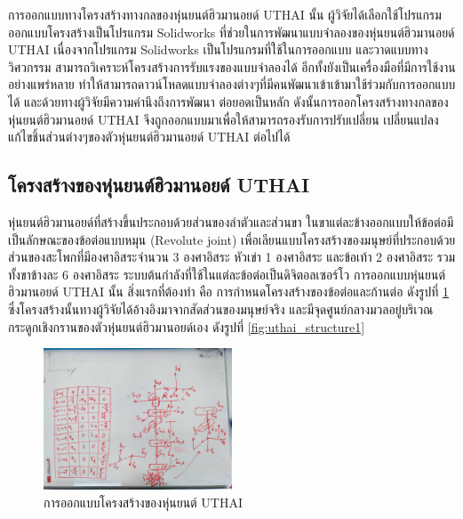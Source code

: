 การออกแบบทางโครงสร้างทางกลของหุ่นยนต์ฮิวมานอยด์ UTHAI นั้น ผู้วิจัยได้เลือกใช้โปรแกรมออกแบบโครงสร้างเป็นโปรแกรม Solidworks
ที่ช่วยในการพัฒนาแบบจำลองของหุ่นยนต์ฮิวมานอยด์ UTHAI
เนื่องจากโปรแกรม Solidworks เป็นโปรแกรมที่ใช้ในการออกแบบ และวาดแบบทางวิศวกรรม
สามารถวิเคราะห์โครงสร้างการรับแรงของแบบจำลองได้ อีกทั้งยังเป็นเครื่องมือที่มีการใช้งานอย่างแพร่หลาย
ทำให้สามารถดาวน์โหลดแบบจำลองต่างๆที่มีคนพัฒนาเข้าเข้ามาใช้ร่วมกับการออกแบบได้ 
และด้วยทางผู้วิจัยมีความคำนึงถึงการพัฒนา ต่อยอดเป็นหลัก ดังนั้นการออกโครงสร้างทางกลของหุ่นยนต์ฮิวมานอยด์ UTHAI
จึงถูกออกแบบมาเพื่อให้สามารถรองรับการปรับเปลี่ยน เปลี่ยนแปลง แก้ไขชิ้นส่วนต่างๆของตัวหุ่นยนต์ฮิวมานอยด์ UTHAI ต่อไปได้

\subsection{โครงสร้างของหุ่นยนต์ฮิวมานอยด์ UTHAI}
หุ่นยนต์ฮิวมานอยด์ที่สร้างขึ้นประกอบด้วยส่วนของลำตัวและส่วนขา ในขาแต่ละข้างออกแบบให้ข้อต่อมีเป็นลักษณะของข้อต่อแบบหมุน (Revolute joint)
เพื่อเลียนแบบโครงสร้างของมนุษย์ที่ประกอบด้วย ส่วนของสะโพกที่มีองศาอิสระจำนวน 3 องศาอิสระ หัวเข่า 1
องศาอิสระ และข้อเท้า 2 องศาอิสระ รวมทั้งขาข้างละ 6 องศาอิสระ ระบบต้นกำลังที่ใช้ในแต่ละข้อต่อเป็นดิจิตอลเซอร์โว
การออกแบบหุ่นยนต์ฮิวมานอยด์ UTHAI นั้น
สิ่งแรกที่ต้องทำ คือ การกำหนดโครงสร้างของข้อต่อและก้านต่อ ดังรูปที่ \ref{fig:uthai_design_structure}
ซึ่งโครงสร้างนั้นทางผู้วิจัยได้อ้างอิงมาจากสัดส่วนของมนุษย์จริง
และมีจุดศูนย์กลางมวลอยู่บริเวณกระดูกเชิงกรานของตัวหุ่นยนต์ฮิวมานอยด์เอง ดังรูปที่ \ref{fig:uthai_structure1}

\begin{figure}[!ht]
    \centering
    \includegraphics[width=0.5\textwidth]{chapter3/images/clean/uthai_design_structure.jpg}
    \caption{การออกแบบโครงสร้างของหุ่นยนต์ UTHAI}
    \label{fig:uthai_design_structure}
\end{figure}

